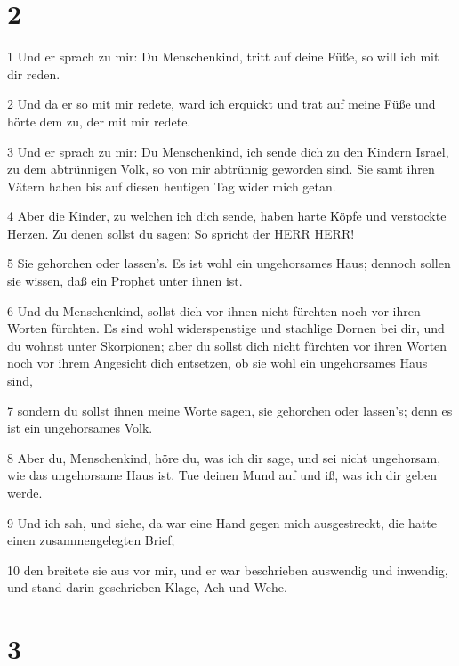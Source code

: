 \chapter{2}

\par 1 Und er sprach zu mir: Du Menschenkind, tritt auf deine Füße, so will ich mit dir reden.
\par 2 Und da er so mit mir redete, ward ich erquickt und trat auf meine Füße und hörte dem zu, der mit mir redete.
\par 3 Und er sprach zu mir: Du Menschenkind, ich sende dich zu den Kindern Israel, zu dem abtrünnigen Volk, so von mir abtrünnig geworden sind. Sie samt ihren Vätern haben bis auf diesen heutigen Tag wider mich getan.
\par 4 Aber die Kinder, zu welchen ich dich sende, haben harte Köpfe und verstockte Herzen. Zu denen sollst du sagen: So spricht der HERR HERR!
\par 5 Sie gehorchen oder lassen's. Es ist wohl ein ungehorsames Haus; dennoch sollen sie wissen, daß ein Prophet unter ihnen ist.
\par 6 Und du Menschenkind, sollst dich vor ihnen nicht fürchten noch vor ihren Worten fürchten. Es sind wohl widerspenstige und stachlige Dornen bei dir, und du wohnst unter Skorpionen; aber du sollst dich nicht fürchten vor ihren Worten noch vor ihrem Angesicht dich entsetzen, ob sie wohl ein ungehorsames Haus sind,
\par 7 sondern du sollst ihnen meine Worte sagen, sie gehorchen oder lassen's; denn es ist ein ungehorsames Volk.
\par 8 Aber du, Menschenkind, höre du, was ich dir sage, und sei nicht ungehorsam, wie das ungehorsame Haus ist. Tue deinen Mund auf und iß, was ich dir geben werde.
\par 9 Und ich sah, und siehe, da war eine Hand gegen mich ausgestreckt, die hatte einen zusammengelegten Brief;
\par 10 den breitete sie aus vor mir, und er war beschrieben auswendig und inwendig, und stand darin geschrieben Klage, Ach und Wehe.

\chapter{3}

